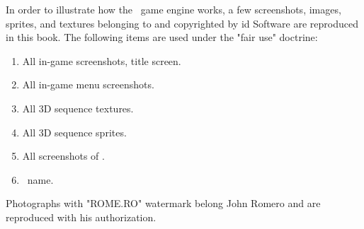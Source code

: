 In order to illustrate how the \doom~game engine works, a few screenshots, images, sprites, and textures belonging to and copyrighted by id Software are reproduced in this book. The following items are used under the "fair use" doctrine:\\
\par
\begin{enumerate}
	\item All in-game screenshots, title screen.
	\item All in-game menu screenshots.
	\item All 3D sequence textures.
    \item All 3D sequence sprites.
    \item All screenshots of \doom.
    \item \doom~name.
\end{enumerate}
\par
Photographs with "ROME.RO" watermark belong John Romero and are reproduced with his authorization.
